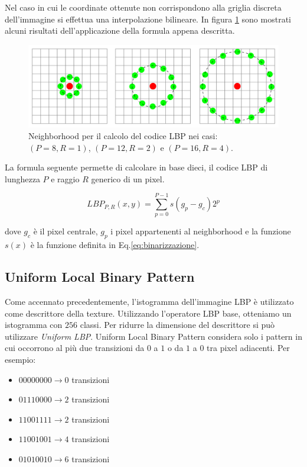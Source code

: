 Nel caso in cui le coordinate ottenute non corrispondono alla griglia discreta dell'immagine si effettua una interpolazione bilineare.
In figura \ref{fig:NeighborhoodLBP} sono mostrati alcuni risultati dell'applicazione della formula appena descritta. \\

\begin{figure}[ht]
\begin{center}
\includegraphics[width=.95\textwidth]{img/raggio_LBP}
\caption{ Neighborhood per il calcolo del codice LBP nei casi: $(P=8, R=1)$, $(P=12, R=2)$ e $(P=16, R=4)$. }
\label{fig:NeighborhoodLBP}
\end{center}
\end{figure}

La formula seguente permette di calcolare in base dieci, il codice LBP di lunghezza $P$ e raggio $R$ generico di un pixel.

\begin{equation}
LBP_{P,R}(x, y) = \sum_{p=0}^{P-1}{s(g_p - g_c)2^p}
\end{equation}

\noindent dove $g_c$ è il pixel centrale, $g_p$ i pixel appartenenti al neighborhood e la funzione $s(x)$ è la funzione definita in Eq.\ref{eq:binarizzazione}.

\subsection{Uniform Local Binary Pattern}
Come accennato precedentemente, l'istogramma dell'immagine LBP è utilizzato come descrittore della texture. Utilizzando l'operatore LBP base, otteniamo un istogramma con $256$ classi. Per ridurre la dimensione del descrittore si può utilizzare \textit{Uniform LBP}. Uniform Local Binary Pattern considera solo i pattern in cui occorrono al più due transizioni da $0$ a $1$ o da $1$ a $0$ tra pixel adiacenti. Per esempio:

\begin{itemize}
	\item $00000000 \rightarrow 0$ transizioni
	\item $01110000 \rightarrow 2$ transizioni
	\item $11001111 \rightarrow 2$ transizioni
	\item $11001001 \rightarrow 4$ transizioni
	\item $01010010 \rightarrow 6$ transizioni
\end{itemize}


